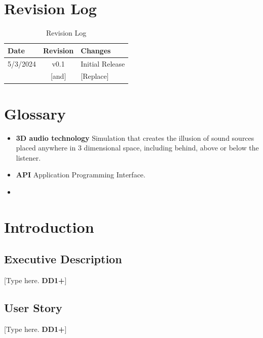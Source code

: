 \documentclass[letterpaper, 11pt]{article}
\begin{document}
\clearpage
\listoftables %

\clearpage
\section*{Revision Log}
\begin{table}[h]
    \begin{tabularx}{\textwidth}{|l|c|X|} %
        \hline
        Date     & Revision & Changes         \\ \hline
        5/3/2024 & v0.1     & Initial Release \\ \hline
        [Copy]   & [and]    & [Replace]       \\ \hline
    \end{tabularx}
    \caption{Revision Log}
\end{table}

\clearpage
\section*{Glossary} %
\begin{itemize} %
    \item \textbf{3D audio technology} Simulation that creates the illusion of sound sources placed anywhere in 3 dimensional space, including behind, above or below the listener.
    \item \textbf{API} Application Programming Interface.
    \item
\end{itemize}

\clearpage
\section{Introduction}
\subsection{Executive Description}
[Type here. \textbf{DD1+}]
\subsection{User Story}
[Type here. \textbf{DD1+}]
\end{document}
